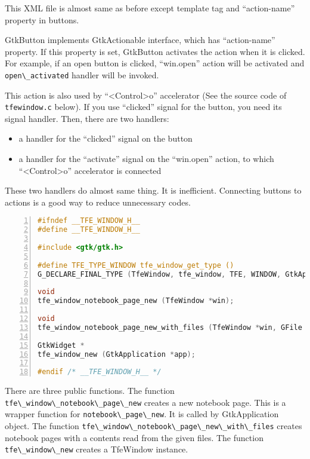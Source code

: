 This XML file is almost same as before except template tag and
``action-name'' property in buttons.

GtkButton implements GtkActionable interface, which has ``action-name''
property. If this property is set, GtkButton activates the action when
it is clicked. For example, if an open button is clicked, ``win.open''
action will be activated and \passthrough{\lstinline!open\_activated!}
handler will be invoked.

This action is also used by ``\textless Control\textgreater o''
accelerator (See the source code of
\passthrough{\lstinline!tfewindow.c!} below). If you use ``clicked''
signal for the button, you need its signal handler. Then, there are two
handlers:

\begin{itemize}
\tightlist
\item
  a handler for the ``clicked'' signal on the button
\item
  a handler for the ``activate'' signal on the ``win.open'' action, to
  which ``\textless Control\textgreater o'' accelerator is connected
\end{itemize}

These two handlers do almost same thing. It is inefficient. Connecting
buttons to actions is a good way to reduce unnecessary codes.

\begin{lstlisting}[language=C, numbers=left]
#ifndef __TFE_WINDOW_H__
#define __TFE_WINDOW_H__

#include <gtk/gtk.h>

#define TFE_TYPE_WINDOW tfe_window_get_type ()
G_DECLARE_FINAL_TYPE (TfeWindow, tfe_window, TFE, WINDOW, GtkApplicationWindow)

void
tfe_window_notebook_page_new (TfeWindow *win);

void
tfe_window_notebook_page_new_with_files (TfeWindow *win, GFile **files, int n_files);

GtkWidget *
tfe_window_new (GtkApplication *app);

#endif /* __TFE_WINDOW_H__ */
\end{lstlisting}

There are three public functions. The function
\passthrough{\lstinline!tfe\_window\_notebook\_page\_new!} creates a new
notebook page. This is a wrapper function for
\passthrough{\lstinline!notebook\_page\_new!}. It is called by
GtkApplication object. The function
\passthrough{\lstinline!tfe\_window\_notebook\_page\_new\_with\_files!}
creates notebook pages with a contents read from the given files. The
function \passthrough{\lstinline!tfe\_window\_new!} creates a TfeWindow
instance.

